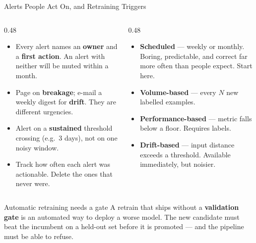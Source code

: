 
\begin{frame}{Alerts People Act On, and Retraining Triggers}

    \begin{columns}[T]
        \begin{column}{0.48\textwidth}
            \begin{tcolorbox}[colback=red!5, colframe=red!50, title=\scriptsize Alerting rules that survive contact]
                \scriptsize
                \begin{itemize}
                    \item Every alert names an \textbf{owner} and a \textbf{first action}. An alert with
                          neither will be muted within a month.
                    \item Page on \textbf{breakage}; e-mail a weekly digest for \textbf{drift}. They are
                          different urgencies.
                    \item Alert on a \textbf{sustained} threshold crossing (e.g.\ 3 days), not on one noisy
                          window.
                    \item Track how often each alert was actionable. Delete the ones that never were.
                \end{itemize}
            \end{tcolorbox}
        \end{column}
        \begin{column}{0.48\textwidth}
            \begin{tcolorbox}[colback=green!5, colframe=green!50!black, title=\scriptsize When to retrain]
                \scriptsize
                \begin{itemize}
                    \item \textbf{Scheduled} --- weekly or monthly. Boring, predictable, and correct far more
                          often than people expect. Start here.
                    \item \textbf{Volume-based} --- every $N$ new labelled examples.
                    \item \textbf{Performance-based} --- metric falls below a floor. Requires labels.
                    \item \textbf{Drift-based} --- input distance exceeds a threshold. Available immediately,
                          but noisier.
                \end{itemize}
            \end{tcolorbox}
        \end{column}
    \end{columns}

    \vspace{0.18em}
    \begin{alertblock}{Automatic retraining needs a gate}
        A retrain that ships without a \textbf{validation gate} is an automated way to deploy a worse model.
        The new candidate must beat the incumbent on a held-out set before it is promoted --- and the
        pipeline must be able to refuse.
    \end{alertblock}

\end{frame}

